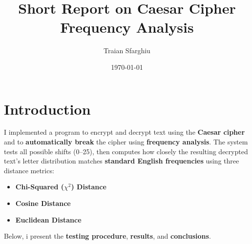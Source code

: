 \documentclass[11pt]{article}
\title{\textbf{Short Report on Caesar Cipher Frequency Analysis}}
\author{Traian Sfarghiu}
\date{\today}
\begin{document}
\maketitle

\section{Introduction}
I implemented a program to encrypt and decrypt text using the \textbf{Caesar cipher} and to 
\textbf{automatically break} the cipher using \textbf{frequency analysis}. The system tests all possible shifts 
(0--25), then computes how closely the resulting decrypted text's letter distribution matches \textbf{standard English frequencies} 
using three distance metrics:
\begin{itemize}
\item \textbf{Chi-Squared ($\chi^2$) Distance}
\item \textbf{Cosine Distance}
\item \textbf{Euclidean Distance}
\end{itemize}
Below, i present the \textbf{testing procedure}, \textbf{results}, and \textbf{conclusions}.
\end{document}

